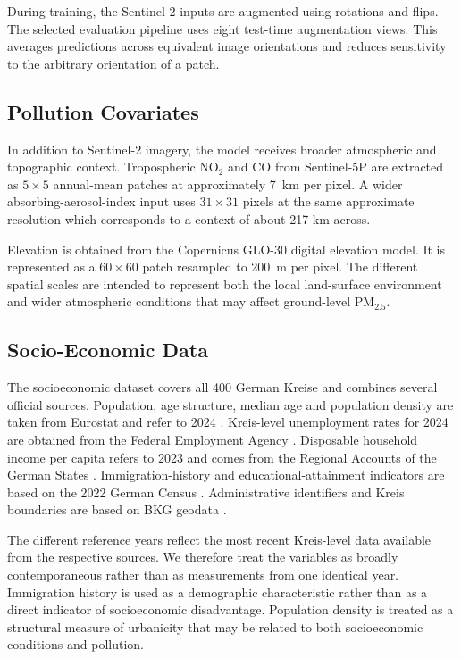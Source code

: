 \documentclass[english, a4paper]{article}
\begin{document}
During training, the Sentinel-2 inputs are augmented using rotations and flips. The selected evaluation pipeline uses eight test-time augmentation views. This averages predictions across equivalent image orientations and reduces sensitivity to the arbitrary orientation of a patch.


\subsection{Pollution Covariates}
\label{sec:covariates}

In addition to Sentinel-2 imagery, the model receives broader atmospheric and topographic context. Tropospheric NO$_2$ and CO from Sentinel-5P are extracted as $5\times5$ annual-mean patches at approximately \SI{7}{\kilo\meter} per pixel. A wider absorbing-aerosol-index input uses $31\times31$ pixels at the same approximate resolution which corresponds to a context of about 217 km across.

Elevation is obtained from the Copernicus GLO-30 digital elevation model. It is represented as a $60\times60$ patch resampled to \SI{200}{\meter} per pixel. The different spatial scales are intended to represent both the local land-surface environment and wider atmospheric conditions that may affect ground-level PM$_{2.5}$.


\subsection{Socio-Economic Data}
\label{sec:socio_data}

The socioeconomic dataset covers all 400 German Kreise and combines several official sources. Population, age structure, median age and population density are taken from Eurostat and refer to 2024 \citep{eurostat_pjanaggr3,eurostat_pjanind3,eurostat_d3dens}. Kreis-level unemployment rates for 2024 are obtained from the Federal Employment Agency \citep{ba_arbeitslosenquoten2024}. Disposable household income per capita refers to 2023 and comes from the Regional Accounts of the German States \citep{vgrdl_r2b3_2023}. Immigration-history and educational-attainment indicators are based on the 2022 German Census \citep{zensus2022_demografie,zensus2022_bildung}. Administrative identifiers and Kreis boundaries are based on BKG geodata \citep{bkg_vg250_2024}.

The different reference years reflect the most recent Kreis-level data available from the respective sources. We therefore treat the variables as broadly contemporaneous rather than as measurements from one identical year. Immigration history is used as a demographic characteristic rather than as a direct indicator of socioeconomic disadvantage. Population density is treated as a structural measure of urbanicity that may be related to both socioeconomic conditions and pollution.
\end{document}
